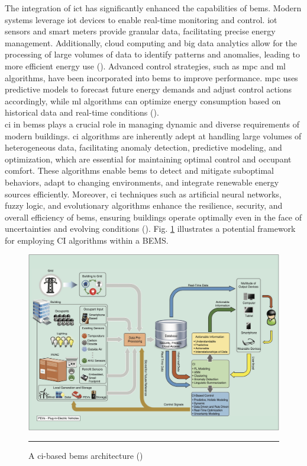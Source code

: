 The integration of \gls{ict} has significantly enhanced the capabilities of \gls{bems}.
Modern systems leverage \gls{iot} devices to enable real-time monitoring and control.
\gls{iot} sensors and smart meters provide granular data, facilitating precise energy management.
Additionally, cloud computing and big data analytics allow for the processing of large volumes of data to identify patterns and anomalies, leading to more efficient energy use (\cite{Bae2021}).
Advanced control strategies, such as \gls{mpc} and \gls{ml} algorithms, have been incorporated into \gls{bems} to improve performance.
\gls{mpc} uses predictive models to forecast future energy demands and adjust control actions accordingly, while \gls{ml} algorithms can optimize energy consumption based on historical data and real-time conditions (\cite{Afram2014}).
\\\gls{ci} in \glspl{bems} plays a crucial role in managing dynamic and diverse requirements of modern buildings.
\gls{ci} algorithms are inherently adept at handling large volumes of heterogeneous data, facilitating anomaly detection, predictive modeling, and optimization, which are essential for maintaining optimal control and occupant comfort.
These algorithms enable \gls{bems} to detect and mitigate suboptimal behaviors, adapt to changing environments, and integrate renewable energy sources efficiently.
Moreover, \gls{ci} techniques such as artificial neural networks, fuzzy logic, and evolutionary algorithms enhance the resilience, security, and overall efficiency of \gls{bems}, ensuring buildings operate optimally even in the face of uncertainties and evolving conditions (\cite{manic2016building}).
Fig. \ref{fig:bems-ci-base-architecture} illustrates a potential framework for employing CI algorithms within a BEMS.

\begin{figure}[htbp]
    \centering
 \includegraphics[width=.9\textwidth]{03_Figures/literature-review/bems-ci-based-architecture.png}
     \rule{35em}{0.5pt}
    \caption{A \gls{ci}-based \gls{bems} architecture (\cite{manic2016building})} 
 \label{fig:bems-ci-base-architecture}
\end{figure}

